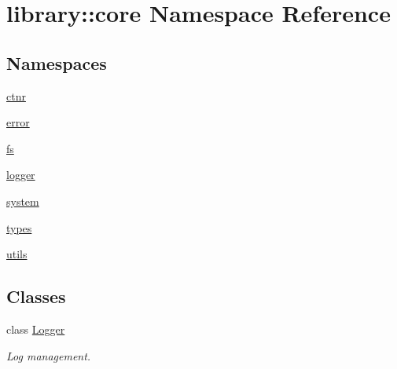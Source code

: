 \hypertarget{namespacelibrary_1_1core}{}\section{library\+::core Namespace Reference}
\label{namespacelibrary_1_1core}
\subsection*{Namespaces}
\begin{DoxyCompactItemize}
\item 
 \mbox{\hyperlink{namespacelibrary_1_1core_1_1ctnr}{ctnr}}
\item 
 \mbox{\hyperlink{namespacelibrary_1_1core_1_1error}{error}}
\item 
 \mbox{\hyperlink{namespacelibrary_1_1core_1_1fs}{fs}}
\item 
 \mbox{\hyperlink{namespacelibrary_1_1core_1_1logger}{logger}}
\item 
 \mbox{\hyperlink{namespacelibrary_1_1core_1_1system}{system}}
\item 
 \mbox{\hyperlink{namespacelibrary_1_1core_1_1types}{types}}
\item 
 \mbox{\hyperlink{namespacelibrary_1_1core_1_1utils}{utils}}
\end{DoxyCompactItemize}
\subsection*{Classes}
\begin{DoxyCompactItemize}
\item 
class \mbox{\hyperlink{classlibrary_1_1core_1_1_logger}{Logger}}
\begin{DoxyCompactList}\small\item\em Log management. \end{DoxyCompactList}\end{DoxyCompactItemize}

